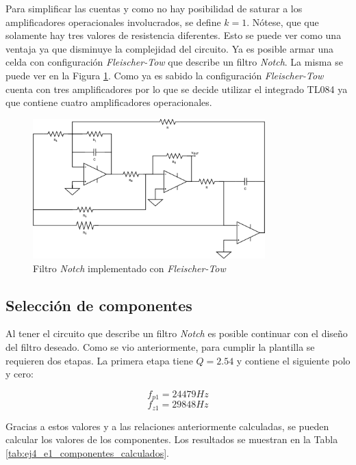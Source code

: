 Para simplificar las cuentas y como no hay posibilidad de saturar a los amplificadores operacionales involucrados, se define $k=1$.  Nótese, que que solamente hay tres valores de resistencia diferentes. Esto se puede ver como una ventaja ya que disminuye la complejidad del circuito. Ya es posible armar una celda con configuración \textit{Fleischer-Tow} que describe un filtro \textit{Notch}. La misma se puede ver en la Figura \ref{ej4_circuito_ft_notch}. Como ya es sabido la configuración \textit{Fleischer-Tow} cuenta con tres amplificadores por lo que se decide utilizar el integrado TL084 ya que contiene cuatro amplificadores operacionales. 

\begin{figure}[h!]                                                       
    \centering\includegraphics[width=0.8\textwidth]{../Ex4/Resources/FT_notch.png}
    \caption{Filtro \textit{Notch} implementado con \textit{Fleischer-Tow}}
    \label{ej4_circuito_ft_notch}
    \end{figure}

\subsection{Selección de componentes}
Al tener el circuito que describe un filtro \textit{Notch} es posible continuar con el diseño del filtro deseado. Como se vio anteriormente, para cumplir la plantilla se requieren dos etapas. La primera etapa tiene $Q = 2.54$ y contiene el siguiente polo y cero:

\begin{displaymath}  f_{p1}   = 24479 Hz\end{displaymath} 
\begin{displaymath}  f_{z1}   = 29848 Hz\end{displaymath} 

Gracias a estos valores y a las relaciones anteriormente calculadas, se pueden calcular los valores de los componentes. Los resultados se muestran en la Tabla \ref{tab:ej4_e1_componentes_calculados}.

